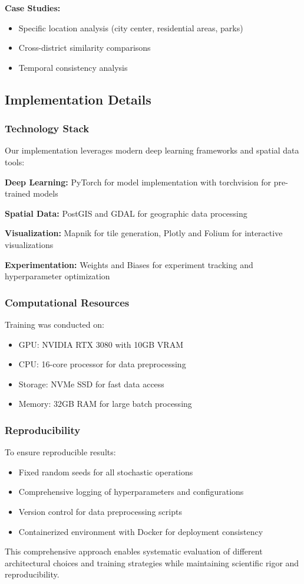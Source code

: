\textbf{Case Studies:}
\begin{itemize}
    \item Specific location analysis (city center, residential areas, parks)
    \item Cross-district similarity comparisons
    \item Temporal consistency analysis
\end{itemize}

\subsection{Implementation Details}

\subsubsection{Technology Stack}

Our implementation leverages modern deep learning frameworks and spatial data tools:

\textbf{Deep Learning:} PyTorch for model implementation with torchvision for pre-trained models

\textbf{Spatial Data:} PostGIS and GDAL for geographic data processing

\textbf{Visualization:} Mapnik for tile generation, Plotly and Folium for interactive visualizations

\textbf{Experimentation:} Weights and Biases for experiment tracking and hyperparameter optimization

\subsubsection{Computational Resources}

Training was conducted on:
\begin{itemize}
    \item GPU: NVIDIA RTX 3080 with 10GB VRAM
    \item CPU: 16-core processor for data preprocessing
    \item Storage: NVMe SSD for fast data access
    \item Memory: 32GB RAM for large batch processing
\end{itemize}

\subsubsection{Reproducibility}

To ensure reproducible results:
\begin{itemize}
    \item Fixed random seeds for all stochastic operations
    \item Comprehensive logging of hyperparameters and configurations
    \item Version control for data preprocessing scripts
    \item Containerized environment with Docker for deployment consistency
\end{itemize}

This comprehensive approach enables systematic evaluation of different architectural choices and training strategies while maintaining scientific rigor and reproducibility.
